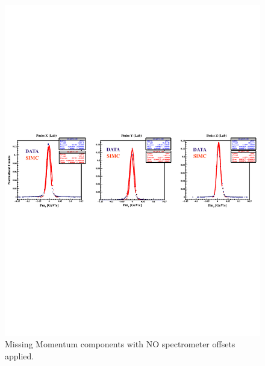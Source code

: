 \documentclass[11pt]{article}
\begin{document}
\begin{figure}[h!]
  \centering
  \includegraphics[scale=0.9]{plots/ORIGINAL_Pm_NOSpecOffsets.pdf}
  \caption{Missing Momentum components with NO spectrometer offsets applied.}
  \label{fig:PmComp_noOffsets}
\end{figure}
\end{document}
